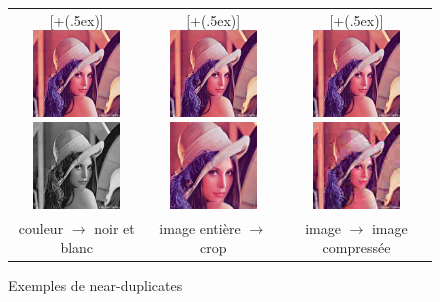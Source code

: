 \documentclass[utf8]{stageM2R} %
\newcommand*{\addheight}[2][.5ex]{%
  \raisebox{0pt}[\dimexpr\height+(#1)\relax]{#2}%
}
\begin{document}
\begin{figure}
\begin{center}
\begin{tabular}{|c|c|c|}
      \hline
      \addheight{\includegraphics[width=23mm]{images/lena_base.jpg} \includegraphics[width=23mm]{images/lena_bw.jpg}} &
      \addheight{\includegraphics[width=23mm]{images/lena_base.jpg} \includegraphics[width=23mm]{images/lena_crop.jpg}} &
      \addheight{\includegraphics[width=23mm]{images/lena_base.jpg} \includegraphics[width=23mm]{images/lena_comp.jpg}} \\
      \small couleur $\to$ noir et blanc & image entière $\to$ crop & image $\to$ image compressée\\
      \hline
\end{tabular}
\label{fig:near-duplicates-images}
\caption{Exemples de near-duplicates}
\end{center}
\end{figure}
\end{document}
